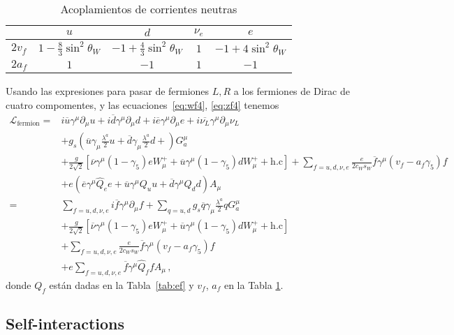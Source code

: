 \begin{frame}
\begin{table}  %
  \centering %
  \begin{tabular}{l|c|c|c|c} %
   &$u$&$d$&$\nu_e$&$e$\\\hline{}
$2v_f$&$1-\frac{8}{3}\sin^2\theta_W$&$-1+\frac{4}{3}\sin^2\theta_W$&$1$&$-1+4\sin^2\theta_W$\\
$2a_f$&$1$&$-1$&$1$&$-1$\\
  \end{tabular} %
  \caption{Acoplamientos de corrientes neutras} %
\label{tab:zcoup}
\end{table} %

Usando las expresiones para pasar de fermiones $L,R$ a los fermiones de Dirac de cuatro compomentes, y las ecuaciones~\eqref{eq:wf4}, \eqref{eq:zf4} tenemos
\begin{align}
\label{eq:lfermionfin}
   \mathcal{L}_{\text{fermion}}
  =&i\overline{u}\gamma^\mu\partial_\mu u+i\overline{d}\gamma^\mu\partial_\mu d+i\overline{e}\gamma^\mu{\partial}_\mu e
+i\overline{\nu_L}\gamma^\mu{\partial}_\mu \nu_L\nonumber\\
&+g_s \left(\overline{u}\gamma_\mu\frac{\lambda^a}{2}u
+\overline{d}\gamma_\mu\frac{\lambda^a}{2}d+ \right)G^\mu_a\nonumber\\
&+\frac{g}{2\sqrt{2}}\left[\overline{\nu}\gamma^\mu(1-\gamma_5)eW_\mu^++
\overline{u}\gamma^\mu(1-\gamma_5)d W_\mu^++\text{h.c}\right]
+\sum_{f=u,d,\nu,e}\frac{e}{2c_W s_W}\overline{f}\gamma^\mu\left(v_f-a_f\gamma_5\right)f\nonumber\\
&+e\left(\overline{e}\gamma^\mu \widehat{Q}_e e+
\overline{u}\gamma^\mu {Q}_u u+
\overline{d}\gamma^\mu {Q}_d d\right) A_\mu\nonumber\\
    =&\sum_{f=u,d,\nu,e}i\overline{f}\gamma^\mu\partial_\mu f+\sum_{q=u,d}g_s\overline{q}\gamma_\mu\frac{\lambda^a}{2}qG^\mu_a\nonumber\\
&+\frac{g}{2\sqrt{2}}\left[\overline{\nu}\gamma^\mu(1-\gamma_5)eW_\mu^++
\overline{u}\gamma^\mu(1-\gamma_5)d W_\mu^++\text{h.c}\right]\nonumber\\
&+\sum_{f=u,d,\nu,e}\frac{e}{2c_W s_W}\overline{f}\gamma^\mu\left(v_f-a_f\gamma_5\right)f\nonumber\\
&+e\sum_{f=u,d,\nu,e}\overline{f}\gamma^\mu \widehat{Q}_f f A_\mu\,,
\end{align}
donde $Q_f$ están dadas en la Tabla~\ref{tab:ef} y $v_f$, $a_f$ en la Tabla \ref{tab:zcoup}.
\end{frame}
\subsection{Self-interactions}

